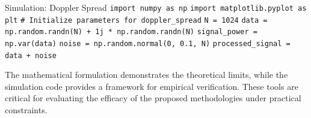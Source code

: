 \begin{pythonbox}{Simulation: Doppler Spread}
\texttt{import numpy as np}
\texttt{import matplotlib.pyplot as plt}
\texttt{}
\texttt{\# Initialize parameters for doppler\_spread}
\texttt{N = 1024}
\texttt{data = np.random.randn(N) + 1j * np.random.randn(N)}
\texttt{signal\_power = np.var(data)}
\texttt{noise = np.random.normal(0, 0.1, N)}
\texttt{processed\_signal = data + noise}
\end{pythonbox}

\vspace{0.5cm}
The mathematical formulation demonstrates the theoretical limits, while the simulation code provides a framework for empirical verification. These tools are critical for evaluating the efficacy of the proposed methodologies under practical constraints.

